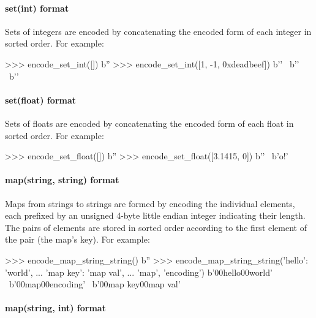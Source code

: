 \paragraph{set(int) format}

Sets of integers are encoded by concatenating the encoded form of each integer
in sorted order.  For example:

\begin{pythoncode}
>>> encode_set_int([])
b''
>>> encode_set_int([1, -1, 0xdeadbeef])
b'\xff\xff\xff\xff\xff\xff\xff\xff' \
b'' \
b'\xef\xbe\xad\xde{}'
\end{pythoncode}

\paragraph{set(float) format}

Sets of floats are encoded by concatenating the encoded form of each float in
sorted order.  For example:

\begin{pythoncode}
>>> encode_set_float([])
b''
>>> encode_set_float([3.1415, 0])
b'' \
b'o\xca!\t@'
\end{pythoncode}

\paragraph{map(string, string) format}

Maps from strings to strings are formed by encoding the individual elements,
each prefixed by an unsigned 4-byte little endian integer indicating their
length.  The pairs of elements are stored in sorted order according to the first
element of the pair (the map's key).  For example:

\begin{pythoncode}
>>> encode_map_string_string({})
b''
>>> encode_map_string_string({'hello': 'world',
...                           'map key': 'map val',
...                           'map', 'encoding'})
b'\x05\x00\x00\x00hello\x05\x00\x00\x00world' \
b'\x00map\x00encoding' \
b'\x00map key\x00map val'
\end{pythoncode}

\paragraph{map(string, int) format}

